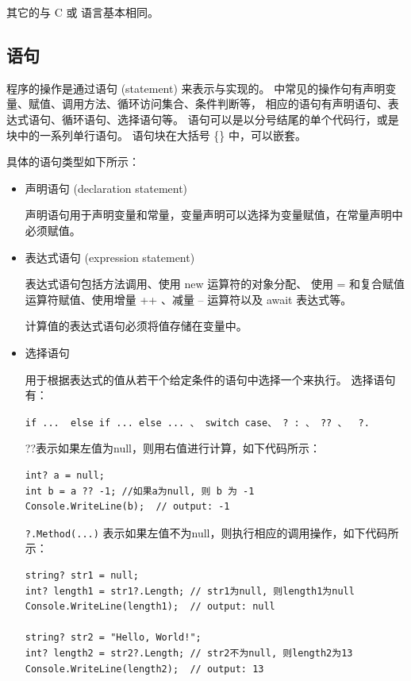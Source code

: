 其它的与 C 或 \cpp 语言基本相同。

\subsection{ 语句 }
程序的操作是通过语句 (statement) 来表示与实现的。
\cs 中常见的操作句有声明变量、赋值、调用方法、循环访问集合、条件判断等，
相应的语句有声明语句、表达式语句、循环语句、选择语句等。
语句可以是以分号结尾的单个代码行，或是块中的一系列单行语句。
语句块在大括号 \{\} 中，可以嵌套。

具体的语句类型如下所示：

\begin{itemize}
    \item 声明语句 (declaration statement)

          声明语句用于声明变量和常量，变量声明可以选择为变量赋值，在常量声明中必须赋值。

    \item 表达式语句 (expression statement)

          表达式语句包括方法调用、使用 new 运算符的对象分配、
          使用 = 和复合赋值运算符赋值、使用增量 ++ 、减量 -- 运算符以及 await 表达式等。

          计算值的表达式语句必须将值存储在变量中。

    \item 选择语句

          用于根据表达式的值从若干个给定条件的语句中选择一个来执行。
          选择语句有：

          \verb|if ...  else if ... else ... 、 switch case、 ? : 、 ?? 、  ?. |

          ??表示如果左值为null，则用右值进行计算，如下代码所示：

          \begin{lstlisting}
int? a = null;
int b = a ?? -1; //如果a为null, 则 b 为 -1
Console.WriteLine(b);  // output: -1
\end{lstlisting}

          \verb|?.Method(...)| 表示如果左值不为null，则执行相应的调用操作，如下代码所示：

          \begin{lstlisting}
string? str1 = null;
int? length1 = str1?.Length; // str1为null, 则length1为null
Console.WriteLine(length1);  // output: null

string? str2 = "Hello, World!";
int? length2 = str2?.Length; // str2不为null, 则length2为13
Console.WriteLine(length2);  // output: 13
\end{lstlisting}


\end{itemize}
